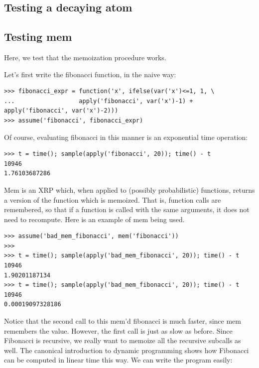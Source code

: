 \documentclass[11pt]{article}
\begin{document}
\subsection{Testing a decaying atom}

\subsection{Testing mem}

Here, we test that the memoization procedure works.  

\noindent Let's first write the fibonacci function, in the naive way:

\begin{small}
\begin{verbatim}
>>> fibonacci_expr = function('x', ifelse(var('x')<=1, 1, \
...                  apply('fibonacci', var('x')-1) + apply('fibonacci', var('x')-2)))
>>> assume('fibonacci', fibonacci_expr)
\end{verbatim}
\end{small}

\noindent Of course, evaluating fibonacci in this manner is an exponential time operation:

\begin{small}
\begin{verbatim}
>>> t = time(); sample(apply('fibonacci', 20)); time() - t
10946
1.76103687286
\end{verbatim}
\end{small}

\noindent Mem is an XRP which, when applied to (possibly probabilistic) functions, returns a version of the function which is memoized.  That is, function calls are remembered, so that if a function is called with the same arguments, it does not need to recompute.  Here is an example of mem being used.

\begin{small}
\begin{verbatim}
>>> assume('bad_mem_fibonacci', mem('fibonacci'))
>>>
>>> t = time(); sample(apply('bad_mem_fibonacci', 20)); time() - t
10946
1.90201187134
>>> t = time(); sample(apply('bad_mem_fibonacci', 20)); time() - t
10946
0.00019097328186
\end{verbatim}
\end{small}

\noindent Notice that the second call to this mem'd fibonacci is much faster, since mem remembers the value.  However, the first call is just as slow as before.  Since Fibonacci is recursive, we really want to memoize all the recursive subcalls as well.  The canonical introduction to dynamic programming shows how Fibonacci can be computed in linear time this way.  We can write the program easily:
\end{document}
